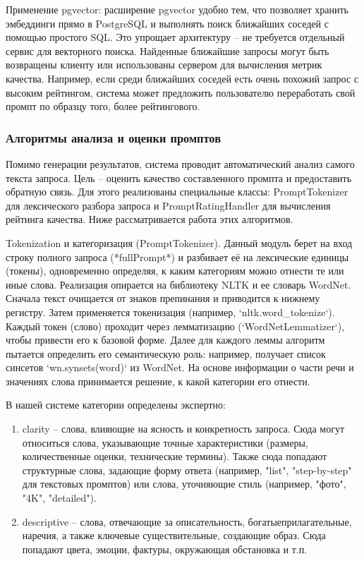 Применение pgvector: расширение pgvector удобно тем, что позволяет хранить эмбеддинги прямо в PostgreSQL и выполнять поиск ближайших соседей с помощью простого SQL. Это упрощает архитектуру – не требуется отдельный сервис для векторного поиска. Найденные ближайшие запросы могут быть возвращены клиенту или использованы сервером для вычисления метрик качества. Например, если среди ближайших соседей есть очень похожий запрос с высоким рейтингом, система может предложить пользователю переработать свой промпт по образцу того, более рейтингового.

\subsubsection{Алгоритмы анализа и оценки промптов}

Помимо генерации результатов, система проводит автоматический анализ самого текста запроса. Цель – оценить качество составленного промпта и предоставить обратную связь. Для этого реализованы специальные классы: PromptTokenizer для лексического разбора запроса и PromptRatingHandler для вычисления рейтинга качества. Ниже рассматривается работа этих алгоритмов.

Tokenization и категоризация (PromptTokenizer). Данный модуль берет на вход строку полного запроса (*fullPrompt*) и разбивает её на лексические единицы (токены), одновременно определяя, к каким категориям можно отнести те или иные слова. Реализация опирается на библиотеку NLTK и ее словарь WordNet. Сначала текст очищается от знаков препинания и приводится к нижнему регистру. Затем применяется токенизация (например, `nltk.word_tokenize`). Каждый токен (слово) проходит через лемматизацию (`WordNetLemmatizer`), чтобы привести его к базовой форме. Далее для каждого леммы алгоритм пытается определить его семантическую роль: например, получает список синсетов `wn.synsets(word)` из WordNet. На основе информации о части речи и значениях слова принимается решение, к какой категории его отнести.

В нашей системе категории определены экспертно:
\begin{enumerate}[label=\arabic*.]
    \item clarity – слова, влияющие на ясность и конкретность запроса. Сюда могут относиться слова, указывающие точные характеристики (размеры, количественные оценки, технические термины). Также сюда попадают структурные слова, задающие форму ответа (например, "list", "step-by-step" для текстовых промптов) или слова, уточняющие стиль (например, "фото", "4K", "detailed").
    \item descriptive – слова, отвечающие за описательность, богатыеприлагательные, наречия, а также ключевые существительные, создающие образ. Сюда попадают цвета, эмоции, фактуры, окружающая обстановка и т.п.
\end{enumerate}

